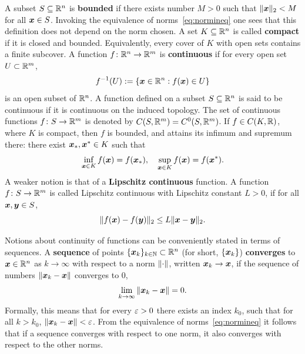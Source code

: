 \documentclass[11pt,a4paper]{memoir}
\begin{document}
A subset $S\subseteq \mathbb{R}^n$ is \textbf{bounded} if there exists number $M>0$ such that $\Vert {\bm{x}}\Vert_2<M$ for all $\bm{x}\in S$. Invoking the equivalence of norms~\eqref{eq:normineq} one sees that this definition does not depend on the norm chosen.
A set $K\subseteq \mathbb{R}^n$ is called \textbf{compact} if it is closed and bounded. Equivalently, every cover of $K$ with open sets contains a finite subcover.  
A function $f\colon \mathbb{R}^n\to \mathbb{R}^m$ is \textbf{continuous} if for every open set $U\subset \mathbb{R}^m$,
\begin{equation*}
 f^{-1}(U) := \{\bm{x}\in \mathbb{R}^n\mathrel{\mathop{:}} f(\bm{x})\in U\}
\end{equation*}
is an open subset of $\mathbb{R}^n$. 
A function defined on a subset $S\subseteq \mathbb{R}^n$ is said to be continuous if it is continuous on the induced topology. The set of continuous functions $f\colon S\to \mathbb{R}^m$ is denoted by $C(S,\mathbb{R}^m)=C^0(S,\mathbb{R}^m)$.
If $f\in C(K,\mathbb{R})$, where $K$ is compact, then $f$ is bounded, and attains its infimum and supremum there: there exist $\bm{x}_*,\bm{x}^*\in K$ such that
\begin{equation*}
 \inf_{\bm{x}\in K} f(\bm{x}) = f(\bm{x}_*), \quad \sup_{\bm{x}\in K} f(\bm{x}) = f(\bm{x}^*).
\end{equation*}
A weaker notion is that of a \textbf{Lipschitz continuous} function. A function $f\colon S\to \mathbb{R}^m$ is called Lipschitz continuous with Lipschitz constant $L>0$, if for all $\bm{x},\bm{y}\in S$,
\begin{equation*}
 \Vert {f(\bm{x})-f(\bm{y})}\Vert_2 \leq L\Vert {\bm{x}-\bm{y}}\Vert_2.
\end{equation*}

\strictpagecheck
Notions about continuity of functions can be conveniently stated in terms of sequences.
A \textbf{sequence} of points $\{\bm{x}_k\}_{k\in \mathbb{N}}\subset \mathbb{R}^n$ (for short, $\{\bm{x}_k\}$) 
\textbf{converges} to $\bm{x}\in \mathbb{R}^n$ as $k\to \infty$ with respect to a norm $\Vert {\cdot}\Vert$, written $\bm{x}_k\to \bm{x}$, if the sequence of numbers $\Vert {\bm{x}_k-\bm{x}}\Vert$ converges to $0$,
\begin{equation*}
 \lim_{k\to \infty} \Vert {\bm{x}_k-\bm{x}}\Vert=0.
\end{equation*}
Formally, this means that for every $\varepsilon>0$ there exists an index $k_0$, such that for all $k>k_0$, $\Vert {\bm{x}_k-\bm{x}}\Vert<\varepsilon$. From the equivalence of norms~\eqref{eq:normineq} it follows that if a sequence converges with respect to one norm, it also converges with respect to the other norms. 
\end{document}
